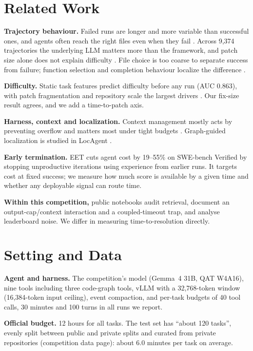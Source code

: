 \documentclass[conference]{IEEEtran}
\begin{document}
\section{Related Work}
\textbf{Trajectory behaviour.} Failed runs are longer and more variable than successful ones, and agents often reach the right files even when they fail \cite{majgaonkar}. Across 9,374 trajectories the underlying LLM matters more than the framework, and patch size alone does not explain difficulty \cite{mehtiyev}. File choice is too coarse to separate success from failure; function selection and completion behaviour localize the difference \cite{shu}.

\textbf{Difficulty.} Static task features predict difficulty before any run (AUC 0.863), with patch fragmentation and repository scale the largest drivers \cite{alhaque}. Our fix-size result agrees, and we add a time-to-patch axis.

\textbf{Harness, context and localization.} Context management mostly acts by preventing overflow and matters most under tight budgets \cite{fan}. Graph-guided localization is studied in LocAgent \cite{locagent}.

\textbf{Early termination.} EET \cite{eet} cuts agent cost by 19--55\% on SWE-bench Verified by stopping unproductive iterations using experience from earlier runs. It targets cost at fixed success; we measure how much score is available by a given time and whether any deployable signal can route time.

\textbf{Within this competition,} public notebooks audit retrieval, document an output-cap/context interaction and a coupled-timeout trap, and analyse leaderboard noise. We differ in measuring time-to-resolution directly.

\section{Setting and Data}
\textbf{Agent and harness.} The competition's model (Gemma~4 31B, QAT W4A16), nine tools including three code-graph tools, vLLM with a 32,768-token window (16,384-token input ceiling), event compaction, and per-task budgets of 40 tool calls, 30 minutes and 100 turns in all runs we report.

\textbf{Official budget.} 12 hours for all tasks. The test set has ``about 120 tasks'', evenly split between public and private splits and curated from private repositories (competition data page): about 6.0 minutes per task on average.
\end{document}
